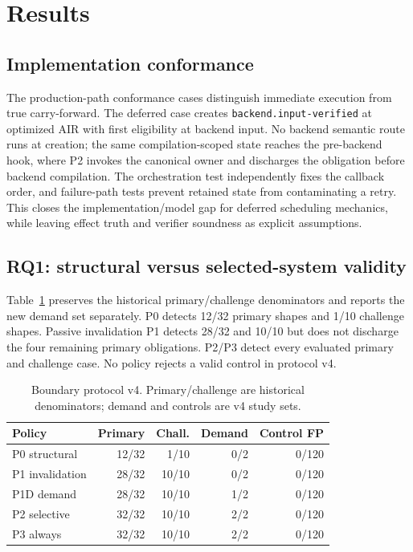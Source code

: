 \section{Results}
\subsection{Implementation conformance}
The production-path conformance cases distinguish immediate execution from true carry-forward. The deferred case creates \texttt{backend.input-verified} at optimized AIR with first eligibility at backend input. No backend semantic route runs at creation; the same compilation-scoped state reaches the pre-backend hook, where P2 invokes the canonical owner and discharges the obligation before backend compilation. The orchestration test independently fixes the callback order, and failure-path tests prevent retained state from contaminating a retry. This closes the implementation/model gap for deferred scheduling mechanics, while leaving effect truth and verifier soundness as explicit assumptions.

\subsection{RQ1: structural versus selected-system validity}
Table~\ref{tab:boundary} preserves the historical primary/challenge denominators and reports the new demand set separately. P0 detects 12/32 primary shapes and 1/10 challenge shapes. Passive invalidation P1 detects 28/32 and 10/10 but does not discharge the four remaining primary obligations. P2/P3 detect every evaluated primary and challenge case. No policy rejects a valid control in protocol v4.

\begin{table}[t]
\caption{Boundary protocol v4. Primary/challenge are historical denominators; demand and controls are v4 study sets.}
\label{tab:boundary}
\small
\begin{tabular}{@{}lrrrr@{}}
\toprule
Policy & Primary & Chall. & Demand & Control FP \\
\midrule
P0 structural & 12/32 & 1/10 & 0/2 & 0/120 \\
P1 invalidation & 28/32 & 10/10 & 0/2 & 0/120 \\
P1D demand & 28/32 & 10/10 & 1/2 & 0/120 \\
P2 selective & 32/32 & 10/10 & 2/2 & 0/120 \\
P3 always & 32/32 & 10/10 & 2/2 & 0/120 \\
\bottomrule
\end{tabular}
\end{table}

